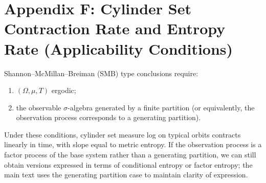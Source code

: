 \section{Appendix F: Cylinder Set Contraction Rate and Entropy Rate (Applicability Conditions)}
\label{app:smb-conditions}

Shannon--McMillan--Breiman (SMB) type conclusions require:
\begin{enumerate}
  \item $(\Omega,\mu,T)$ ergodic;
  \item the observable $\sigma$-algebra generated by a finite partition (or equivalently, the observation process corresponds to a generating partition).
\end{enumerate}

Under these conditions, cylinder set measure log on typical orbits contracts linearly in time, with slope equal to metric entropy. If the observation process is a factor process of the base system rather than a generating partition, we can still obtain versions expressed in terms of conditional entropy or factor entropy; the main text uses the generating partition case to maintain clarity of expression.
